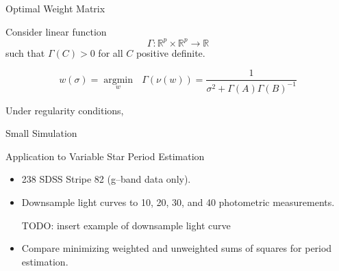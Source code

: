 \documentclass[12pt]{beamer}
\newcommand{\argmin}[1]{\underset{#1}{\operatorname{argmin}}\text{ }}
\newcommand{\todo}[1]{{\color{red}TODO: #1}}
\begin{document}
\begin{frame}{Optimal Weight Matrix}

  Consider linear function
  \begin{equation*}
    \Gamma: \mathbb{R}^p \times \mathbb{R}^p \rightarrow \mathbb{R}
  \end{equation*}
  such that $\Gamma(C) > 0$ for all $C$ positive definite.
  
  \begin{theorem}
    \begin{equation*}
      w(\sigma) = \argmin{w} \Gamma(\nu(w)) = \frac{1}{\sigma^2 + \Gamma(A)\Gamma(B)^{-1}}
    \end{equation*}
  \end{theorem}

  \begin{theorem}[Adaptivity]
    Under regularity conditions, 
  \end{theorem}


\end{frame}

\begin{frame}{Small Simulation}

\end{frame}




  


\begin{frame}{Application to Variable Star Period Estimation}
\begin{itemize}
\item 238 SDSS Stripe 82 (g--band data only).
\item Downsample light curves to 10, 20, 30, and 40 photometric measurements.

\todo{insert example of downsample light curve}
  
\item Compare minimizing weighted and unweighted sums of squares for period estimation.

\end{itemize}
\end{frame}
\end{document}
